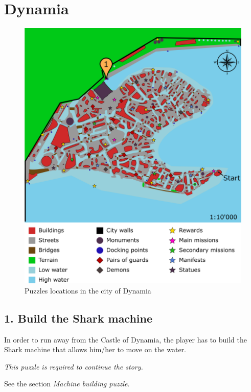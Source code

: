 \section{Dynamia}

\begin{figure}[H]
  \centering
  \includegraphics[width=\textwidth]{Images/Maps/dynamiaPuzzles}
  \caption{Puzzles locations in the city of Dynamia}
\end{figure}

\subsection{1. Build the Shark machine}

In order to run away from the Castle of Dynamia, the player has to build the Shark machine that allows him/her to move on the water.

\textit{This puzzle is required to continue the story.}

See the section \textit{Machine building puzzle}.
